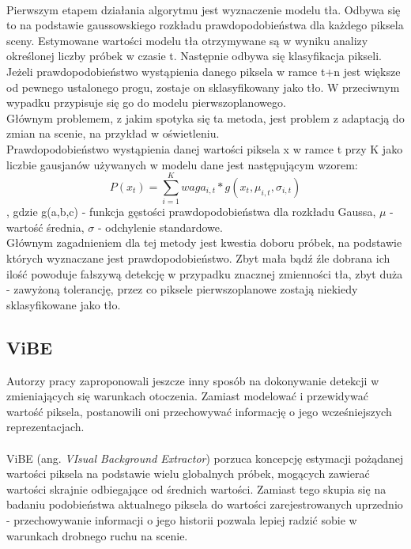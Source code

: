 \paragraph{}
Pierwszym etapem działania algorytmu jest wyznaczenie modelu tła. Odbywa się to na podstawie gaussowskiego rozkładu prawdopodobieństwa dla każdego piksela sceny. Estymowane wartości modelu tła otrzymywane są w wyniku analizy określonej liczby próbek w czasie t. Następnie odbywa się klasyfikacja pikseli. Jeżeli prawdopodobieństwo wystąpienia danego piksela w ramce t+n jest większe od pewnego ustalonego progu, zostaje on sklasyfikowany jako tło. W przeciwnym wypadku przypisuje się go do modelu pierwszoplanowego.\\
Głównym problemem, z jakim spotyka się ta metoda, jest problem z adaptacją do zmian na scenie, na przykład w oświetleniu.\\
Prawdopodobieństwo wystąpienia danej wartości piksela x w ramce t przy K jako liczbie gausjanów używanych w modelu dane jest następującym wzorem:
\begin{equation}
P(x_{t}) = \sum_{i=1}^{K} waga_{i,t}*g(x_{t},\mu_{i,t},\sigma_{i,t})
\end{equation}
, gdzie g(a,b,c) - funkcja gęstości prawdopodobieństwa dla rozkładu Gaussa, $\mu$ - wartość średnia, $\sigma$ - odchylenie standardowe.\\
Głównym zagadnieniem dla tej metody jest kwestia doboru próbek, na podstawie których wyznaczane jest prawdopodobieństwo. Zbyt mała bądź źle dobrana ich ilość powoduje fałszywą detekcję w przypadku znacznej zmienności tła, zbyt duża - zawyżoną tolerancję, przez co piksele pierwszoplanowe zostają niekiedy sklasyfikowane jako tło.

\subsection{ViBE}
Autorzy pracy \cite{barnich2011vibe} zaproponowali jeszcze inny sposób na dokonywanie detekcji w zmieniających się warunkach otoczenia. Zamiast modelować i przewidywać wartość piksela, postanowili oni przechowywać informację o jego wcześniejszych reprezentacjach.
\paragraph{}
ViBE (ang. \textit{VIsual Background Extractor}) porzuca koncepcję estymacji pożądanej wartości piksela na podstawie wielu globalnych próbek, mogących zawierać wartości skrajnie odbiegające od średnich wartości. Zamiast tego skupia się na badaniu podobieństwa aktualnego piksela do wartości zarejestrowanych uprzednio - przechowywanie informacji o jego historii pozwala lepiej radzić sobie w warunkach drobnego ruchu na scenie.
